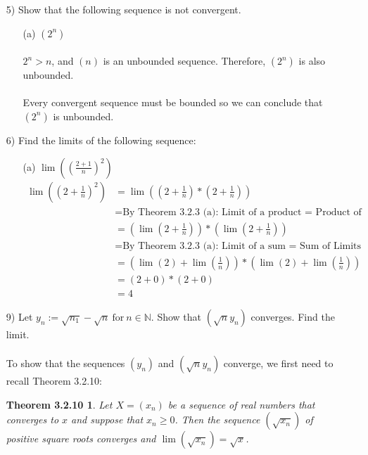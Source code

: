 \documentclass[12pt,letterpaper]{article}
\newtheorem*{3.2.10}{Theorem 3.2.10}
\theoremstyle{case}
\begin{document}
\begin{enumerate}
\begin{enumerate}
			\item[5)] Show that the following sequence is not convergent.
			\begin{enumerate}
				\item[(a)] $(2^n)$
				\\\\$2^n > n$, and $(n)$ is an unbounded sequence. Therefore, $(2^n)$ is also unbounded.
				\\\\Every convergent sequence must be bounded so we can conclude that $(2^n)$ is unbounded.
			\end{enumerate}
			\item[6)] Find the limits of the following sequence:
			\begin{enumerate}
				\item[(a)] $\lim ((\frac{2+1}{n})^2)$
				\begin{align*}
					\lim \left(\left(2+\frac{1}{n}\right)^2\right) &= \lim \left(\left(2+\frac{1}{n}\right)*\left(2+\frac{1}{n}\right)\right)
					\\ &= \text{By Theorem 3.2.3 (a): Limit of a product = Product of limits}
					\\ &= \left(\lim\left(2+\frac{1}{n}\right)\right) * \left(\lim\left(2+\frac{1}{n}\right)\right)
					\\ &= \text{By Theorem 3.2.3 (a): Limit of a sum = Sum of Limits}
					\\ &= \left(\lim (2)+\lim\left(\frac{1}{n}\right)\right)*\left(\lim (2) + \lim \left(\frac{1}{n}\right)\right)
					\\ &= (2+0)*(2+0)
					\\ &=4
				\end{align*}
			\end{enumerate}
			\item[9)] Let $y_n := \sqrt{n_1}-\sqrt{n}\ \text{for}\ n \in \mathbb{N}$. Show that $(\sqrt{n}y_n)$ converges. Find the limit.
			\\\\To show that the sequences $(y_n)$ and $(\sqrt{n}y_n)$ converge, we first need to recall Theorem 3.2.10:
			
			\begin{3.2.10}
				Let $X=(x_n)$ be a sequence of real numbers that converges to $x$ and suppose that $x_n \geq 0$. Then the sequence $(\sqrt{x_n})$ of positive square roots converges and $\lim (\sqrt{x_n})=\sqrt{x}$.
			\end{3.2.10}
			

\end{enumerate}
\end{enumerate}
\end{document}
